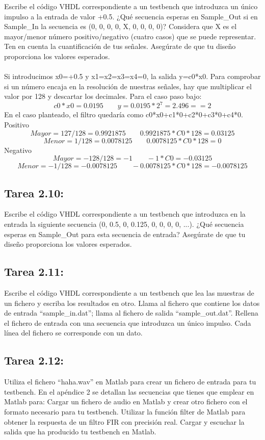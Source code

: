 \documentclass{article}
\begin{document}
Escribe el código VHDL correspondiente a un testbench que introduzca un único impulso a la entrada de valor +0.5. ¿Qué secuencia esperas en Sample{\_}Out si en Sample{\_}In la secuencia es (0, 0, 0, 0, X, 0, 0, 0, 0)? Considera que X es el mayor/menor número positivo/negativo (cuatro casos) que se puede representar. Ten en cuenta la cuantificación
de tus señales. Asegúrate de que tu diseño proporciona los valores esperados.\\
\\
Si introducimos x0=+0.5 y x1=x2=x3=x4=0, la salida y=c0*x0. Para comprobar si un número encaja en la resolución de nuestras señales, hay que multiplicar el valor por 128 y descartar los decimales. Para el caso paso bajo:
\[c0*x0=0.0195 \qquad y=0.0195*2^7=2.496==2 \]
En el caso planteado, el filtro quedaría como c0*x0+c1*0+c2*0+c3*0+c4*0.
Positivo
\[Mayor= 127/128= 0.9921875 \qquad  0.9921875*C0*128=0.03125\]
\[Menor= 1/128= 0.0078125 \qquad  0.0078125*C0*128=0\]
Negativo
\[Mayor= -128/128= -1 \qquad -1*C0=-0.03125\]
\[Menor= -1/128= -0.0078125 \qquad  -0.0078125*C0*128= -0.0078125\]


\subsection{Tarea 2.10:}

Escribe el código VHDL correspondiente a un testbench que introduzca en la entrada
la siguiente secuencia (0, 0.5, 0, 0.125, 0, 0, 0, 0, ...). ¿Qué secuencia esperas en Sample{\_}Out para esta secuencia de entrada? Asegúrate de que tu diseño proporciona los valores esperados.

\subsection{Tarea 2.11:}
Escribe el código VHDL correspondiente a un testbench que lea las muestras de un fichero y escriba los resultados en otro.
Llama al fichero que contiene los datos de entrada “sample{\_}in.dat”; llama al fichero de salida “sample{\_}out.dat”.
Rellena el fichero de entrada con una secuencia que introduzca un único impulso.
Cada línea del fichero se corresponde con un dato.

\subsection{Tarea 2.12:}

Utiliza el fichero “haha.wav” en Matlab para crear un fichero de entrada para tu testbench. En el apéndice 2 se detallan las secuencias que tienes que emplear en Matlab para:
Cargar un fichero de audio en Matlab y crear otro fichero con el formato necesario para tu testbench.
Utilizar la función filter de Matlab para obtener la respuesta de un filtro FIR con precisión real.
Cargar y escuchar la salida que ha producido tu testbench en Matlab.
\end{document}
